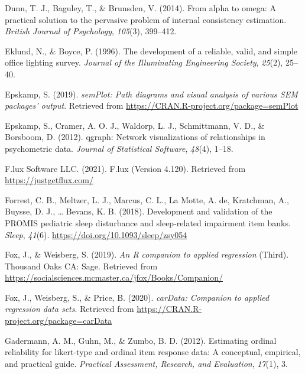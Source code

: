 \documentclass[
  english,
  man]{apa6}
\newlength{\cslhangindent}
\newlength{\cslentryspacingunit} %
\newenvironment{CSLReferences}[2] %
 {%
  \setlength{\parindent}{0pt}
  \ifodd #1
  \let\oldpar\par
  \def\par{\hangindent=\cslhangindent\oldpar}
  \fi
  \setlength{\parskip}{#2\cslentryspacingunit}
 }%
 {}
\begin{document}
\begin{CSLReferences}{1}{0}
\leavevmode{}%
Dunn, T. J., Baguley, T., \& Brunsden, V. (2014). From alpha to omega: A practical solution to the pervasive problem of internal consistency estimation. \emph{British Journal of Psychology}, \emph{105}(3), 399--412.

\leavevmode{}%
Eklund, N., \& Boyce, P. (1996). The development of a reliable, valid, and simple office lighting survey. \emph{Journal of the Illuminating Engineering Society}, \emph{25}(2), 25--40.

\leavevmode{}%
Epskamp, S. (2019). \emph{semPlot: Path diagrams and visual analysis of various SEM packages' output}. Retrieved from \url{https://CRAN.R-project.org/package=semPlot}

\leavevmode{}%
Epskamp, S., Cramer, A. O. J., Waldorp, L. J., Schmittmann, V. D., \& Borsboom, D. (2012). {qgraph}: Network visualizations of relationships in psychometric data. \emph{Journal of Statistical Software}, \emph{48}(4), 1--18.

\leavevmode{}%
F.lux Software LLC. (2021). F.lux (Version 4.120). Retrieved from \url{https://justgetflux.com/}

\leavevmode{}%
Forrest, C. B., Meltzer, L. J., Marcus, C. L., La Motte, A. de, Kratchman, A., Buysse, D. J., \ldots{} Bevans, K. B. (2018). Development and validation of the PROMIS pediatric sleep disturbance and sleep-related impairment item banks. \emph{Sleep}, \emph{41}(6). \url{https://doi.org/10.1093/sleep/zsy054}

\leavevmode{}%
Fox, J., \& Weisberg, S. (2019). \emph{An {R} companion to applied regression} (Third). Thousand Oaks {CA}: Sage. Retrieved from \url{https://socialsciences.mcmaster.ca/jfox/Books/Companion/}

\leavevmode{}%
Fox, J., Weisberg, S., \& Price, B. (2020). \emph{carData: Companion to applied regression data sets}. Retrieved from \url{https://CRAN.R-project.org/package=carData}

\leavevmode{}%
Gadermann, A. M., Guhn, M., \& Zumbo, B. D. (2012). Estimating ordinal reliability for likert-type and ordinal item response data: A conceptual, empirical, and practical guide. \emph{Practical Assessment, Research, and Evaluation}, \emph{17}(1), 3.


\end{CSLReferences}
\end{document}
